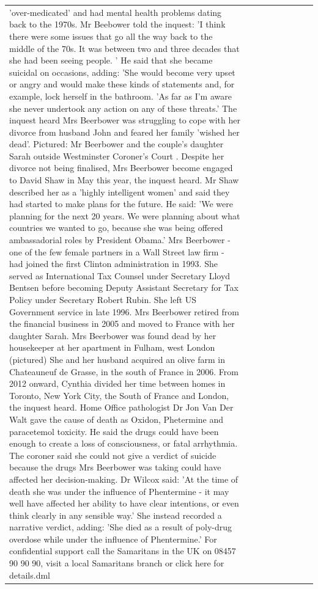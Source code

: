 \begin{table}[H]
\begin{tabular}{lllrlllll}
'over-medicated' and had mental health problems dating back to the 1970s. Mr Beebower told the inquest: 'I think there were some issues that go all the way back to the middle of the 70s. It was between two and three decades that she had been seeing people. ' He said that she became suicidal on occasions, adding: 'She would become very upset or angry and would make these kinds of statements and, for example, lock herself in the bathroom. 'As far as I'm aware she never undertook any action on any of these threats.' The inquest heard Mrs Beerbower was struggling to cope with her divorce from husband John and feared her family 'wished her dead'. Pictured: Mr Beerbower and the couple's daughter Sarah outside Westminster Coroner's Court . Despite her divorce not being finalised, Mrs Beerbower become engaged to David Shaw in May this year, the inquest heard. Mr Shaw described her as a 'highly intelligent women' and said they had started to make plans for the future. He said: 'We were planning for the next 20 years. We were planning about what countries we wanted to go, because she was being offered ambassadorial roles by President Obama.' Mrs Beerbower - one of the few female partners in a Wall Street law firm - had joined the first Clinton administration in 1993. She served as International Tax Counsel under Secretary Lloyd Bentsen before becoming Deputy Assistant Secretary for Tax Policy under Secretary Robert Rubin. She left US Government service in late 1996. Mrs Beerbower retired from the financial business in 2005 and moved to France with her daughter Sarah. Mrs Beerbower was found dead by her housekeeper at her apartment in Fulham, west London (pictured) She and her husband acquired an olive farm in Chateauneuf de Grasse, in the south of France in 2006. From 2012 onward, Cynthia divided her time between homes in Toronto, New York City, the South of France and London, the inquest heard. Home Office pathologist Dr Jon Van Der Walt gave the cause of death as Oxidon, Phetermine and paracetemol toxicity. He said the drugs could have been enough to create a loss of consciousness, or fatal arrhythmia. The coroner said she could not give a verdict of suicide because the drugs Mrs Beerbower was taking could have affected her decision-making. Dr Wilcox said: 'At the time of death she was under the influence of Phentermine - it may well have affected her ability to have clear intentions, or even think clearly in any sensible way.' She instead recorded a narrative verdict, adding: 'She died as a result of poly-drug overdose while under the influence of Phentermine.' For confidential support call the Samaritans in the UK on 08457 90 90 90, visit a local Samaritans branch or click here for details.dml \\

\end{tabular}
\end{table}
